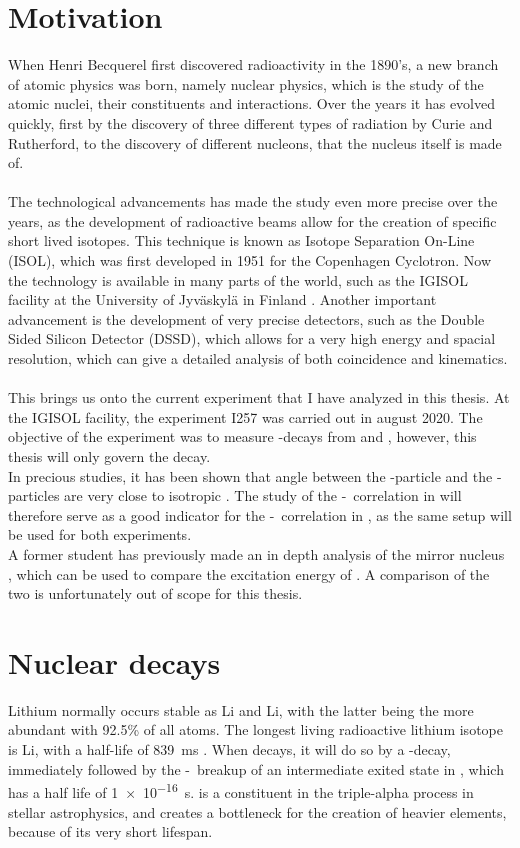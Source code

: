 \section{Motivation}
When Henri Becquerel first discovered radioactivity in the 1890's, a new branch of atomic physics was born, namely nuclear physics, which is the study of the atomic nuclei, their constituents and interactions. 
Over the years it has evolved quickly, first by the discovery of three different types of radiation by Curie and Rutherford, to the discovery of different nucleons, that the nucleus itself is made of.  \\
\\
The technological advancements has made the study even more precise over the years, as the development of radioactive beams allow for the creation of specific short lived isotopes.
This technique is known as Isotope Separation On-Line (ISOL), which was first developed in 1951 for the Copenhagen Cyclotron. 
Now the technology is available in many parts of the world, such as the IGISOL facility at the University of Jyväskylä in Finland \cite{igisol}. 
Another important advancement is the development of very precise detectors, such as the Double Sided Silicon Detector (DSSD), which allows for a very high energy and spacial resolution, which can give a detailed analysis of both coincidence and kinematics. \\
\\
This brings us onto the current experiment that I have analyzed in this thesis. At the IGISOL facility, the experiment I257 was carried out in august 2020. The objective of the experiment was to measure \be-decays from \li and , however, this thesis will only govern the \li decay. \\
In precious studies, it has been shown that angle between the \be-particle and the \al-particles are very close to isotropic \cite{isotrop}. The study of the \be-\al\ correlation in \li will therefore serve as a good indicator for the \be-\al\ correlation in , as the same setup will be used for both experiments. \\
A former student has previously made an in depth analysis of the mirror nucleus , which can be used to compare the excitation energy of \ber \cite{andreas}. A comparison of the two is unfortunately out of scope for this thesis.


\section{Nuclear decays}
Lithium normally occurs stable as \isotope[6]Li and \isotope[7]Li, with the latter being the more abundant with 92.5\% of all atoms. The longest living radioactive lithium isotope is \isotope[8]Li, with a half-life of \SI{839}{ms} \cite{TILLEY2004155}. 
When \li decays, it will do so by a \be-decay, immediately followed by the \al-\al\ breakup of an intermediate exited state in \ber, which has a half life of \SI{1e-16}{s}. \ber is a constituent in the triple-alpha process in stellar astrophysics, and creates a bottleneck for the creation of heavier elements, because of its very short lifespan.

